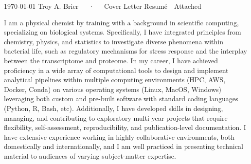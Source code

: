 \documentclass[11pt, a4paper]{awesome-cv}
\begin{document}
	
	\makecvheader[R]
	
	
	\makecvfooter
	{\today}
	{Troy A. Brier~~~·~~~Cover Letter}
	{Resum\'{e}~~Attached}
	
	\makelettertitle
	\vspace{-10pt}
	\begin{cvletter}
		\vspace{-7.5pt}
		I am a physical chemist by training with a background in scientific computing, specializing on biological systems.
		Specifically, I have integrated principles from chemistry, physics, and statistics to investigate diverse phenomena within bacterial life, such as regulatory mechanisms for stress response and the interplay between the transcriptome and proteome.	
		In my career, I have achieved proficiency in a wide array of computational tools to design and implement analytical pipelines within multiple computing environments (HPC, AWS, Docker, Conda) on various operating systems (Linux, MacOS, Windows) leveraging both custom and pre-built software with standard coding languages (Python, R, Bash, etc).
		Additionally, I have developed skills in designing, managing, and contributing to exploratory multi-year projects that require flexibility, self-assessment, reproducibility, and publication-level documentation.
		I have extensive experience working in highly collaborative environments, both domestically and internationally, and I am well practiced in presenting technical material to audiences of varying subject-matter expertise.
		

\end{cvletter}
\end{document}

